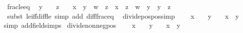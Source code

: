 \begin{isabellebody}
\endisatagproof
{\isafoldproof}%
%
\isadelimproof
\isanewline
%
\endisadelimproof
\isanewline
{}\isamarkupfalse%
\ frac{\isacharunderscore}{\kern0pt}le{\isacharunderscore}{\kern0pt}eq{\isacharcolon}{\kern0pt}\isanewline
\ \ {\isachardoublequoteopen}y\ {\isasymnoteq}\ {}\ {\isasymLongrightarrow}\ z\ {\isasymnoteq}\ {}\ {\isasymLongrightarrow}\ x\ {\isacharslash}{\kern0pt}\ y\ {\isasymle}\ w\ {\isacharslash}{\kern0pt}\ z\ {\isasymlongleftrightarrow}\ {\isacharparenleft}{\kern0pt}x\ {\isacharasterisk}{\kern0pt}\ z\ {\isacharminus}{\kern0pt}\ w\ {\isacharasterisk}{\kern0pt}\ y{\isacharparenright}{\kern0pt}\ {\isacharslash}{\kern0pt}\ {\isacharparenleft}{\kern0pt}y\ {\isacharasterisk}{\kern0pt}\ z{\isacharparenright}{\kern0pt}\ {\isasymle}\ {}{\isachardoublequoteclose}\isanewline
%
\isadelimproof
\ \ %
\endisadelimproof
%
\isatagproof
{}\isamarkupfalse%
\ {\isacharparenleft}{\kern0pt}subst\ le{\isacharunderscore}{\kern0pt}iff{\isacharunderscore}{\kern0pt}diff{\isacharunderscore}{\kern0pt}le{\isacharunderscore}{\kern0pt}{}{\isacharparenright}{\kern0pt}\ {\isacharparenleft}{\kern0pt}simp\ add{\isacharcolon}{\kern0pt}\ diff{\isacharunderscore}{\kern0pt}frac{\isacharunderscore}{\kern0pt}eq\ {\isacharparenright}{\kern0pt}%
\endisatagproof
{\isafoldproof}%
%
\isadelimproof
\isanewline
%
\endisadelimproof
\isanewline
{}\isamarkupfalse%
\ divide{\isacharunderscore}{\kern0pt}pos{\isacharunderscore}{\kern0pt}pos{\isacharbrackleft}{\kern0pt}simp{\isacharbrackright}{\kern0pt}{\isacharcolon}{\kern0pt}\isanewline
\ \ {\isachardoublequoteopen}{}\ {\isacharless}{\kern0pt}\ x\ {\isasymLongrightarrow}\ {}\ {\isacharless}{\kern0pt}\ y\ {\isasymLongrightarrow}\ {}\ {\isacharless}{\kern0pt}\ x\ {\isacharslash}{\kern0pt}\ y{\isachardoublequoteclose}\isanewline
%
\isadelimproof
%
\endisadelimproof
%
\isatagproof
{}\isamarkupfalse%
{\isacharparenleft}{\kern0pt}simp\ add{\isacharcolon}{\kern0pt}field{\isacharunderscore}{\kern0pt}simps{\isacharparenright}{\kern0pt}%
\endisatagproof
{\isafoldproof}%
%
\isadelimproof
\isanewline
%
\endisadelimproof
\isanewline
{}\isamarkupfalse%
\ divide{\isacharunderscore}{\kern0pt}nonneg{\isacharunderscore}{\kern0pt}pos{\isacharcolon}{\kern0pt}\isanewline
\ \ {\isachardoublequoteopen}{}\ {\isasymle}\ x\ {\isasymLongrightarrow}\ {}\ {\isacharless}{\kern0pt}\ y\ {\isasymLongrightarrow}\ {}\ {\isasymle}\ x\ {\isacharslash}{\kern0pt}\ y{\isachardoublequoteclose}\isanewline

\end{isabellebody}
